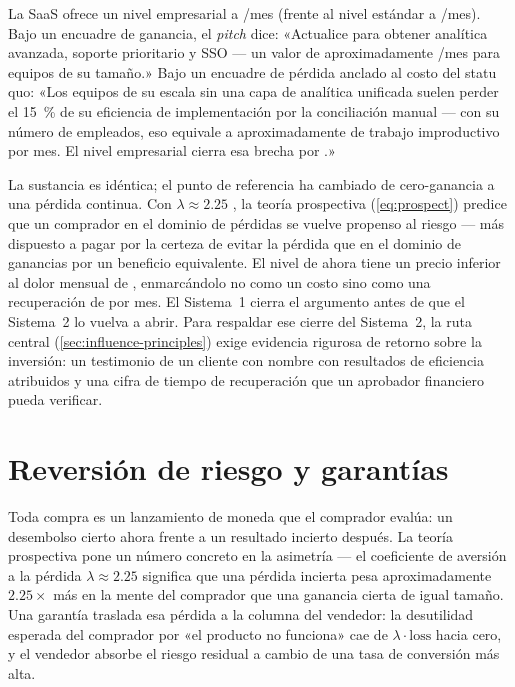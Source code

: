 \begin{example}
La SaaS ofrece un nivel empresarial a /mes (frente al nivel estándar a /mes).
Bajo un encuadre de ganancia, el \emph{pitch} dice: «Actualice para obtener analítica avanzada,
soporte prioritario y SSO --- un valor de aproximadamente /mes para equipos de su
tamaño.» Bajo un encuadre de pérdida anclado al costo del statu quo: «Los equipos de su escala
sin una capa de analítica unificada suelen perder el \qty{15}{\percent} de su eficiencia de
implementación por la conciliación manual --- con su número de empleados, eso equivale a
aproximadamente  de trabajo improductivo por mes. El nivel empresarial cierra esa
brecha por .»

La sustancia es idéntica; el punto de referencia ha cambiado de cero-ganancia a una pérdida
continua. Con $\lambda \approx 2.25$ \parencite{tversky1992cumulative}, la teoría prospectiva
(\cref{eq:prospect}) predice que un comprador en el dominio de pérdidas se vuelve propenso al
riesgo --- más dispuesto a pagar por la certeza de evitar la pérdida que en el dominio de
ganancias por un beneficio equivalente. El nivel de  ahora tiene un precio inferior
al dolor mensual de , enmarcándolo no como un costo sino como una recuperación de
 por mes. El Sistema~1 cierra el argumento antes de que el Sistema~2 lo vuelva a
abrir. Para respaldar ese cierre del Sistema~2, la ruta central (\cref{sec:influence-principles})
exige evidencia rigurosa de retorno sobre la inversión: un testimonio de un cliente con nombre
con resultados de eficiencia atribuidos y una cifra de tiempo de recuperación que un aprobador
financiero pueda verificar.
\end{example}


\section{Reversión de riesgo y garantías}\label{sec:risk-reversal}

Toda compra es un lanzamiento de moneda que el comprador evalúa: un desembolso cierto ahora
frente a un resultado incierto después. La teoría prospectiva \parencite{tversky1992cumulative}
pone un número concreto en la asimetría --- el coeficiente de aversión a la pérdida
$\lambda \approx 2.25$ significa que una pérdida incierta pesa aproximadamente $2.25 \times$
más en la mente del comprador que una ganancia cierta de igual tamaño. Una garantía traslada
esa pérdida a la columna del vendedor: la desutilidad esperada del comprador por «el producto
no funciona» cae de $\lambda \cdot \text{loss}$ hacia cero, y el vendedor absorbe el riesgo
residual a cambio de una tasa de conversión más alta.

